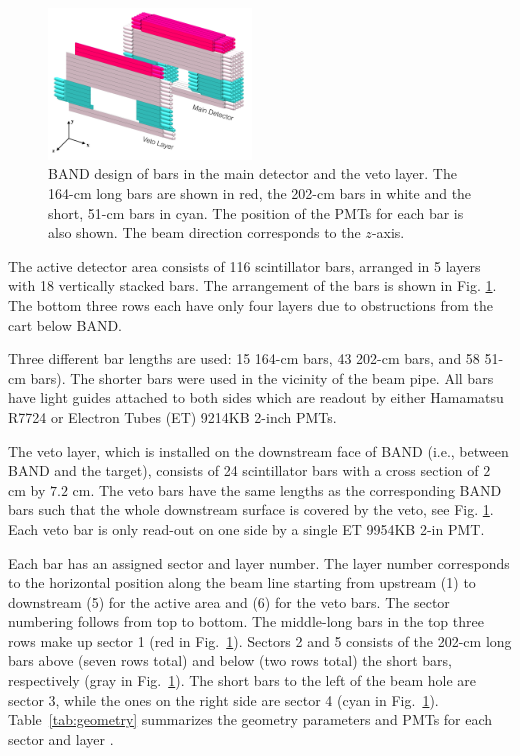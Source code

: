\documentclass[3p,final,twocolumn]{elsarticle}
\begin{document}
\begin{figure}[tb]
	\centering
			\includegraphics[width=0.48\textwidth]{band-schematic.pdf}
                        \caption{BAND design of bars in the main
                          detector and the veto layer. The 164-\si{\centi\meter} long bars are shown in
                          red, the 202-\si{\centi\meter} bars in white
                          and the short, 51-\si{\centi\meter} bars in cyan. The position of
                          the PMTs for each bar is also shown. The
                          beam direction corresponds to the $z$-axis.
                        }
		\label{fig:design}
\end{figure}

The active detector area consists of 116 scintillator bars, arranged
in 5 layers with 18 vertically stacked bars. The arrangement of the
bars is shown in Fig. \ref{fig:design}. The bottom three rows each have only
four layers due to obstructions from the cart below BAND.

Three different bar lengths are used: 15 164-\si{\centi\meter} bars, 43 202-\si{\centi\meter} bars, and 58 
51-\si{\centi\meter}  bars). The shorter bars were used in the vicinity of
the beam pipe. All bars have light guides attached to both sides which
are readout by either Hamamatsu R7724 \cite{pmtR7724} or Electron
Tubes (ET) 9214KB \cite{pmt9214} 2-inch PMTs.

The veto layer, which is installed on the downstream face of BAND
(i.e., between BAND and the target),
consists of 24 scintillator bars with a cross section of $2$
\si{\centi\meter} by $7.2$ \si{\centi\meter}. The veto bars have the
same lengths as the corresponding BAND bars such that the whole
downstream surface is covered by the veto, see
Fig. \ref{fig:design}. Each veto bar is only read-out on one side by a
single ET 9954KB \cite{pmt9954} 2-in PMT.

Each bar has an assigned sector and layer number. The layer number
corresponds to the horizontal position along the beam line starting
from upstream (1) to downstream (5) for the active area and (6) for
the veto bars. The sector numbering follows from top to bottom. The
middle-long bars in the top three rows make up sector 1 (red in
Fig.~\ref{fig:design}). Sectors 2 and 5 consists of the 202-cm long bars above
(seven rows total) and below (two rows total) the short bars,
respectively (gray in Fig.~\ref{fig:design}). The short bars to the
left of the beam hole are sector 3, while the ones on the right side
are sector 4 (cyan in Fig.~\ref{fig:design}).
Table~\ref{tab:geometry} summarizes the geometry parameters and PMTs
for each sector and layer .
\end{document}
